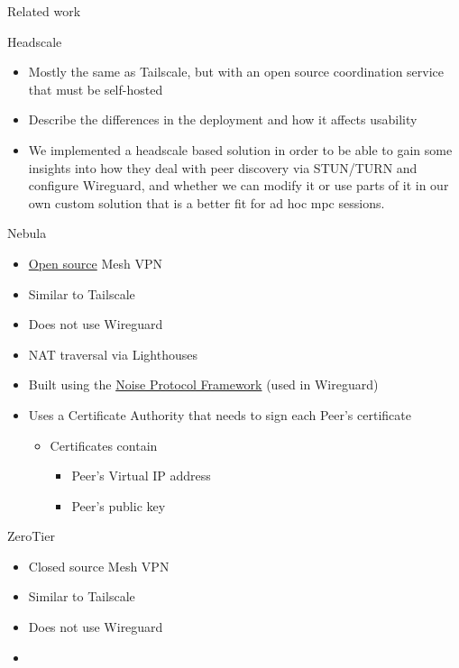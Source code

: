 \begin{frame}[fragile]{Related work}
\begin{block}{Headscale}
\protect\hypertarget{headscale}{}
\begin{itemize}
\tightlist
\item
  Mostly the same as Tailscale, but with an open source coordination
  service that must be self-hosted
\item
  Describe the differences in the deployment and how it affects
  usability
\item
  We implemented a headscale based solution in order to be able to gain
  some insights into how they deal with peer discovery via STUN/TURN and
  configure Wireguard, and whether we can modify it or use parts of it
  in our own custom solution that is a better fit for ad hoc mpc
  sessions.
\end{itemize}
\end{block}

\begin{block}{Nebula}
\protect\hypertarget{nebula}{}
\begin{itemize}
\tightlist
\item
  \href{https://github.com/slackhq/nebula}{Open source} Mesh VPN
\item
  Similar to Tailscale
\item
  Does not use Wireguard
\item
  NAT traversal via Lighthouses
\item
  Built using the \href{notes/02022-noise}{Noise Protocol Framework}
  (used in Wireguard)
\item
  Uses a Certificate Authority that needs to sign each Peer's
  certificate

  \begin{itemize}
  \tightlist
  \item
    Certificates contain

    \begin{itemize}
    \tightlist
    \item
      Peer's Virtual IP address
    \item
      Peer's public key
    \end{itemize}
  \end{itemize}
\end{itemize}
\end{block}

\begin{block}{ZeroTier}
\protect\hypertarget{zerotier}{}
\begin{itemize}
\tightlist
\item
  Closed source Mesh VPN
\item
  Similar to Tailscale
\item
  Does not use Wireguard
\item
\end{itemize}
\end{block}


\end{frame}
